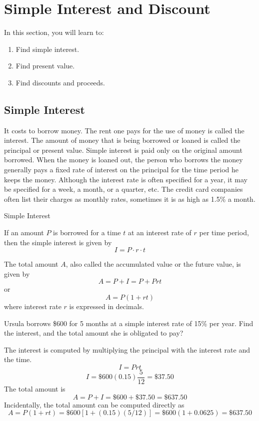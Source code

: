 \section{Simple Interest and Discount}

In this section, you will learn to:
\begin{enumerate}
    \item Find simple interest.
    \item Find present value.
    \item Find discounts and proceeds.
\end{enumerate}

\subsection{Simple Interest}
It costs to borrow money. The rent one pays for the use of money is called the interest. The amount of money that is being borrowed or loaned is called the principal or present value. Simple interest is paid only on the original amount borrowed. When the money is loaned out, the person who borrows the money generally pays a fixed rate of interest on the principal for the time period he keeps the money. Although the interest rate is often specified for a year, it may be specified for a week, a month, or a quarter, etc. The credit card companies often list their charges as monthly rates, sometimes it is as high as 1.5\% a month.

\begin{summarybox}{Simple Interest}

    If an amount \( P \) is borrowed for a time \( t \) at an interest rate of \( r \) per time period, then the simple interest is given by
    \[ I = P \cdot r \cdot t \]

    The total amount \( A \), also called the accumulated value or the future value, is given by
    \[ A = P + I = P + Prt \]
    or
    \[ A = P(1 + rt) \]
    where interest rate \( r \) is expressed in decimals.
\end{summarybox}

\begin{example}
    Ursula borrows \$600 for 5 months at a simple interest rate of 15\% per year. Find the interest, and the total amount she is obligated to pay?
\end{example}

\begin{solution}
    The interest is computed by multiplying the principal with the interest rate and the time.
    \[ I = Prt \]
    \[ I = \$600 (0.15) \frac{5}{12} = \$37.50 \]
    The total amount is
    \[ A = P + I = \$600 + \$37.50 = \$637.50 \]
    Incidentally, the total amount can be computed directly as
    \[ A = P(1 + rt) = \$600[1 + (0.15)(5/12)] = \$600(1 + 0.0625) = \$637.50 \]
\end{solution}

